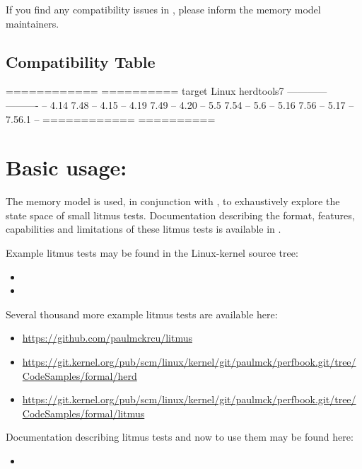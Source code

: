 If you find any compatibility issues in , please inform the
memory model maintainers.

\subsection{ Compatibility Table}

\begin{VerbatimU}
	============  ==========
	target Linux  herdtools7
	------------  ----------
	     -- 4.14  7.48 --
	4.15 -- 4.19  7.49 --
	4.20 -- 5.5   7.54 --
	5.6  -- 5.16  7.56 --
	5.17 --       7.56.1 --
	============  ==========
\end{VerbatimU}

\section{Basic usage: }

The memory model is used, in conjunction with , to exhaustively
explore the state space of small litmus tests.
Documentation describing the format, features, capabilities and
limitations of these litmus tests is available in
.

Example litmus tests may be found in the Linux-kernel source tree:

\begin{itemize}
  \item {}
  \item {}
\end{itemize}

Several thousand more example litmus tests are available here:

\begin{itemize}
  \item \url{https://github.com/paulmckrcu/litmus}
  \item \url{https://git.kernel.org/pub/scm/linux/kernel/git/paulmck/perfbook.git/tree/CodeSamples/formal/herd}
  \item \url{https://git.kernel.org/pub/scm/linux/kernel/git/paulmck/perfbook.git/tree/CodeSamples/formal/litmus}
\end{itemize}

Documentation describing litmus tests and now to use them may be found
here:

\begin{itemize}
  \item {}
\end{itemize}

